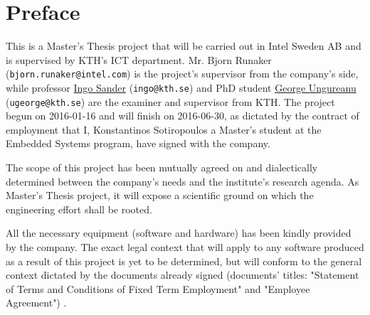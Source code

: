 \documentclass[12pt,twoside]{article}
\begin{document}
\section*{Preface}
\label{sec-2}
This is a Master's Thesis project that will be carried out in Intel Sweden AB and is supervised by KTH's ICT department.
Mr. Bjorn Runaker (\texttt{bjorn.runaker@intel.com}) is the project's supervisor from the company's side, 
while professor \href{https://people.kth.se/~ingo/}{Ingo Sander} (\texttt{ingo@kth.se}) and PhD student \href{http://people.kth.se/~ugeorge/}{George Ungureanu} (\texttt{ugeorge@kth.se}) are the examiner and supervisor from KTH. 
The project begun on 2016-01-16 and will finish on 2016-06-30, as dictated by the contract of employment that I, Konstantinos Sotiropoulos a Master's student at the Embedded Systems program, have signed with the company.

The scope of this project has been mutually agreed on and dialectically determined between the company's needs and the institute's research agenda.
As Master's Thesis project, it will expose a scientific ground on which the engineering effort shall be rooted.

All the necessary equipment (software and hardware) has been kindly provided by the company.
The exact legal context that will apply to any software produced as a result of this project is yet to be determined, 
but will conform to the general context dictated by the documents already signed (documents' titles:  "Statement of Terms and Conditions of Fixed Term Employment" and "Employee Agreement") .
\clearpage
\end{document}
